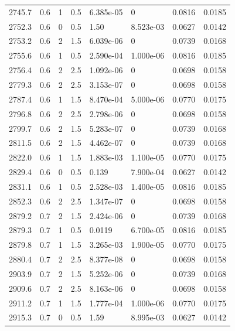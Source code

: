 \documentclass[preview]{standalone}
\begin{document}
{{{{{{{\begin{tabular}{L{1.2cm}C{1.2cm} C{0.3cm}C{0.5cm} C{1.4cm}C{1.4cm} C{1.4cm}C{1.4cm}}
  2745.7  &   0.6  & 1     & 0.5 &  6.385e-05  & 0  & 0.0816 &  0.0185   \\ 
  2752.3  &   0.6  & 0     & 0.5 &  1.50  & 8.523e-03  & 0.0627 &  0.0142   \\ 
  2753.2  &   0.6  & 2     & 1.5 &  6.039e-06  & 0  & 0.0739 &  0.0168   \\ 
  2755.6  &   0.6  & 1     & 0.5 &  2.590e-04  & 1.000e-06  & 0.0816 &  0.0185   \\ 
  2756.4  &   0.6  & 2     & 2.5 &  1.092e-06  & 0  & 0.0698 &  0.0158   \\ 
  2779.3  &   0.6  & 2     & 2.5 &  3.153e-07  & 0  & 0.0698 &  0.0158   \\ 
  2787.4  &   0.6  & 1     & 1.5 &  8.470e-04  & 5.000e-06  & 0.0770 &  0.0175   \\ 
  2796.8  &   0.6  & 2     & 2.5 &  2.798e-06  & 0  & 0.0698 &  0.0158   \\ 
  2799.7  &   0.6  & 2     & 1.5 &  5.283e-07  & 0  & 0.0739 &  0.0168   \\ 
  2811.5  &   0.6  & 2     & 1.5 &  4.462e-07  & 0  & 0.0739 &  0.0168   \\ 
  2822.0  &   0.6  & 1     & 1.5 &  1.883e-03  & 1.100e-05  & 0.0770 &  0.0175   \\ 
  2829.4  &   0.6  & 0     & 0.5 &  0.139  & 7.900e-04  & 0.0627 &  0.0142   \\ 
  2831.1  &   0.6  & 1     & 0.5 &  2.528e-03  & 1.400e-05  & 0.0816 &  0.0185   \\ 
  2852.3  &   0.6  & 2     & 2.5 &  1.347e-07  & 0  & 0.0698 &  0.0158   \\ 
  2879.2  &   0.7  & 2     & 1.5 &  2.424e-06  & 0  & 0.0739 &  0.0168   \\ 
  2879.3  &   0.7  & 1     & 0.5 &  0.0119  & 6.700e-05  & 0.0816 &  0.0185   \\ 
  2879.8  &   0.7  & 1     & 1.5 &  3.265e-03  & 1.900e-05  & 0.0770 &  0.0175   \\ 
  2880.4  &   0.7  & 2     & 2.5 &  8.377e-08  & 0  & 0.0698 &  0.0158   \\ 
  2903.9  &   0.7  & 2     & 1.5 &  5.252e-06  & 0  & 0.0739 &  0.0168   \\ 
  2909.6  &   0.7  & 2     & 2.5 &  8.163e-06  & 0  & 0.0698 &  0.0158   \\ 
  2911.2  &   0.7  & 1     & 1.5 &  1.777e-04  & 1.000e-06  & 0.0770 &  0.0175   \\ 
  2915.3  &   0.7  & 0     & 0.5 &  1.59  & 8.995e-03  & 0.0627 &  0.0142   \\ 

\end{tabular}}}}}}}}
\end{document}
